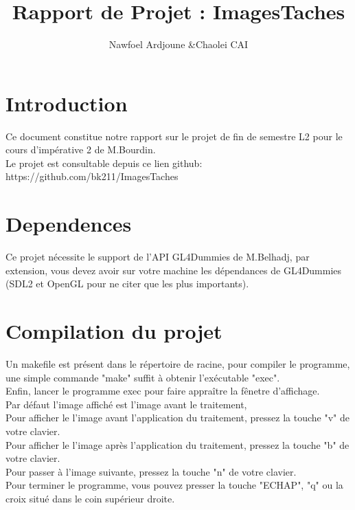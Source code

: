 \documentclass[12pt, letterpaper]{article}
\title{Rapport de Projet : ImagesTaches}
\author{Nawfoel Ardjoune \&Chaolei CAI}
\begin{document}
\begin{titlepage}
\maketitle
\end{titlepage}

\tableofcontents
\section{Introduction}
Ce document constitue notre rapport sur le projet de fin de semestre L2 pour le cours d'impérative 2 de M.Bourdin. \\
Le projet est consultable depuis ce lien github: https://github.com/bk211/ImagesTaches\\


\section{Dependences}
Ce projet nécessite le support de l'API GL4Dummies de M.Belhadj, 
par extension, vous devez avoir sur votre machine les dépendances de GL4Dummies 
(SDL2 et OpenGL pour ne citer que les plus importants).

\section{Compilation du projet}
Un makefile est présent dans le répertoire de racine, pour compiler le programme, une simple
commande "make" suffit à obtenir l'exécutable "exec".\\
Enfin, lancer le programme exec pour faire appraître la fênetre d'affichage.\\
Par défaut l'image affiché est l'image avant le traitement, \\
Pour afficher le l'image avant l'application du traitement, pressez la touche "v" de votre clavier.\\
Pour afficher le l'image après l'application du traitement, pressez la touche "b" de votre clavier.\\
Pour passer à l'image suivante, pressez la touche "n" de votre clavier.\\
Pour terminer le programme, vous pouvez presser la touche "ECHAP", "q" ou la croix situé dans le coin supérieur droite.
\end{document}
